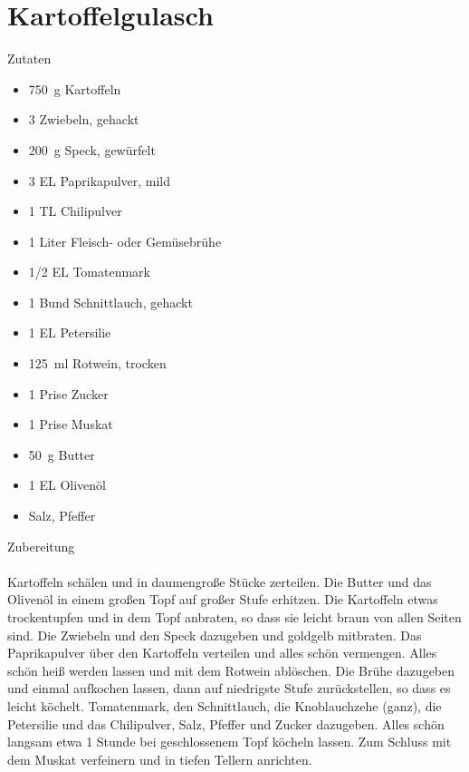 \section*{Kartoffelgulasch}
\ihead{}\ohead{}
\cfoot{}
{\Large Zutaten}
\begin{multicols}{2}
\begin{itemize}
    \item \SI{750}{g} Kartoffeln
    \item \num{3} Zwiebeln, gehackt
    \item \SI{200}{g} Speck, gewürfelt
    \item \num{3} EL Paprikapulver, mild
    \item \num{1} TL Chilipulver
    \item \num{1} Liter Fleisch- oder Gemüsebrühe
    \item \num{1/2} EL Tomatenmark
    \item \num{1} Bund Schnittlauch, gehackt
    \item \num{1} EL Petersilie
    \item \SI{125}{ml} Rotwein, trocken
    \item \num{1} Prise Zucker
    \item \num{1} Prise Muskat
    \item \SI{50}{g} Butter
    \item \num{1} EL Olivenöl
    \item Salz, Pfeffer
\end{itemize}
\end{multicols}
\noindent
{\Large Zubereitung}\\
\\
Kartoffeln schälen und in daumengroße Stücke zerteilen. 
Die Butter und das Olivenöl in einem großen Topf auf großer Stufe erhitzen. 
Die Kartoffeln etwas trockentupfen und in dem Topf anbraten, so dass sie leicht braun von allen Seiten sind. 
Die Zwiebeln und den Speck dazugeben und goldgelb mitbraten. 
Das Paprikapulver über den Kartoffeln verteilen und alles schön vermengen. 
Alles schön heiß werden lassen und mit dem Rotwein ablöschen.
Die Brühe dazugeben und einmal aufkochen lassen, dann auf niedrigste Stufe zurückstellen, so dass es leicht köchelt. 
Tomatenmark, den Schnittlauch, die Knoblauchzehe (ganz), die Petersilie und das Chilipulver, Salz, Pfeffer und Zucker dazugeben. 
Alles schön langsam etwa 1 Stunde bei geschlossenem Topf köcheln lassen. 
Zum Schluss mit dem Muskat verfeinern und in tiefen Tellern anrichten.


